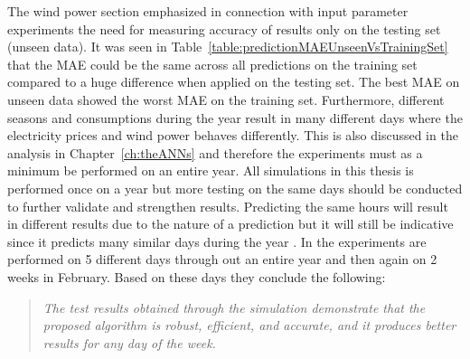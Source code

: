 The wind power section emphasized in connection with input parameter experiments the need for measuring accuracy of results only on the testing set (unseen data). It was seen in Table~\ref{table:predictionMAEUnseenVsTrainingSet} that the MAE could be the same across all predictions on the training set compared to a huge difference when applied on the testing set. The best MAE on unseen data showed the worst MAE on the training set. Furthermore, different seasons and consumptions during the year result in many different days where the electricity prices and wind power behaves differently. This is also discussed in the analysis in Chapter~\ref{ch:theANNs} and therefore the experiments must as a minimum be performed on an entire year. All simulations in this thesis is performed once on a year but more testing on the same days should be conducted to further validate and strengthen results. Predicting the same hours will result in different results due to the nature of a prediction but it will still be indicative since it predicts many similar days during the year . In \cite{1} the experiments are performed on 5 different days through out an entire year and then again on 2 weeks in February. Based on these days they conclude the following:

\begin{quotation}
\textit{The test results obtained through the simulation demonstrate that the proposed algorithm is robust, efficient, and accurate, and it produces better results for any day of the week.}
\end{quotation}

